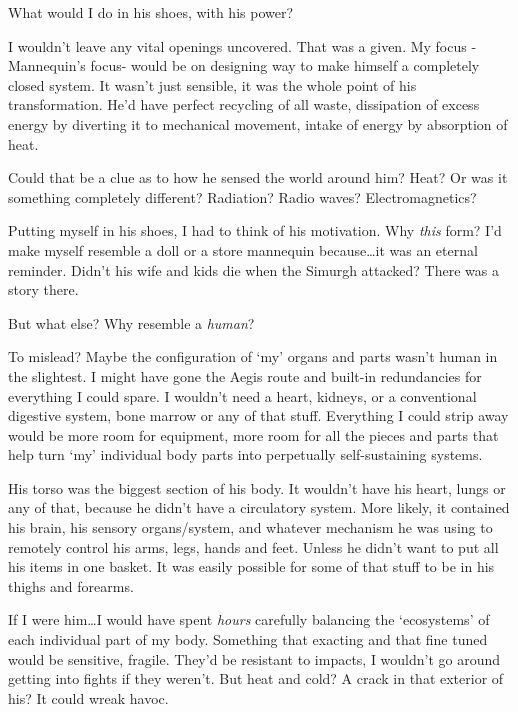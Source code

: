 What would I do in his shoes, with his power?



I wouldn't leave any vital openings uncovered.  That was a given.  My focus -Mannequin's focus- would be on designing way to make himself a completely closed system.  It wasn't just sensible, it was the whole point of his transformation.  He'd have perfect recycling of all waste, dissipation of excess energy by diverting it to mechanical movement, intake of energy by absorption of heat.



Could that be a clue as to how he sensed the world around him?  Heat?  Or was it something completely different?  Radiation?  Radio waves?  Electromagnetics?



Putting myself in his shoes, I had to think of his motivation.  Why \emph{this} form?  I'd make myself resemble a doll or a store mannequin because\ldots it was an eternal reminder.  Didn't his wife and kids die when the Simurgh attacked?  There was a story there.



But what else?  Why resemble a \emph{human}?



To mislead?  Maybe the configuration of `my' organs and parts wasn't human in the slightest.  I might have gone the Aegis route and built-in redundancies for everything I could spare.  I wouldn't need a heart, kidneys, or a conventional digestive system, bone marrow or any of that stuff.  Everything I could strip away would be more room for equipment, more room for all the pieces and parts that help turn `my' individual body parts into perpetually self-sustaining systems.



His torso was the biggest section of his body.  It wouldn't have his heart, lungs or any of that, because he didn't have a circulatory system.  More likely, it contained his brain, his sensory organs/system, and whatever mechanism he was using to remotely control his arms, legs, hands and feet.  Unless he didn't want to put all his items in one basket.  It was easily possible for some of that stuff to be in his thighs and forearms.



If I were him\ldots I would have spent \emph{hours} carefully balancing the `ecosystems' of each individual part of my body.  Something that exacting and that fine tuned would be sensitive, fragile.  They'd be resistant to impacts, I wouldn't go around getting into fights if they weren't.  But heat and cold?  A crack in that exterior of his?  It could wreak havoc.




